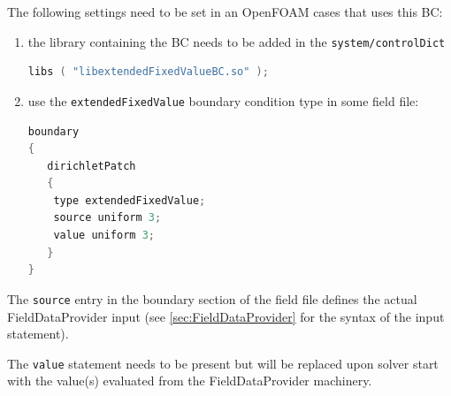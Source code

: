 The following settings need to be set in an OpenFOAM cases that uses this BC:

\begin{enumerate}
\item the library containing the BC needs to be added in the \texttt{system/controlDict}

\begin{lstlisting}[language=c++]
libs ( "libextendedFixedValueBC.so" );
\end{lstlisting}

\item use the \texttt{extendedFixedValue} boundary condition type in some field file:

\begin{lstlisting}[language=c++]
boundary
{
   dirichletPatch
   {
	type extendedFixedValue;
	source uniform 3;
	value uniform 3;
   }
}
\end{lstlisting}

\end{enumerate}

The \texttt{source} entry in the boundary section of the field file defines the actual FieldDataProvider input (see \ref{sec:FieldDataProvider} for the syntax of the input statement). 

The \texttt{value} statement needs to be present but will be replaced upon solver start with the value(s) evaluated from the FieldDataProvider machinery.